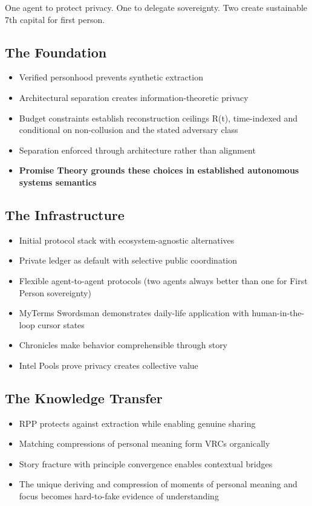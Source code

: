 \documentclass[
]{article}
\begin{document}
One agent to protect privacy. One to delegate sovereignty. Two create
sustainable 7th capital for first person.

\subsection{The Foundation}\label{the-foundation}

\begin{itemize}
\item
  Verified personhood prevents synthetic extraction
\item
  Architectural separation creates information-theoretic privacy
\item
  Budget constraints establish reconstruction ceilings R(t),
  time-indexed and conditional on non-collusion and the stated adversary
  class
\item
  Separation enforced through architecture rather than alignment
\item
  \textbf{Promise Theory grounds these choices in established autonomous
  systems semantics}
\end{itemize}

\subsection{The Infrastructure}\label{the-infrastructure}

\begin{itemize}
\item
  Initial protocol stack with ecosystem-agnostic alternatives
\item
  Private ledger as default with selective public coordination
\item
  Flexible agent-to-agent protocols (two agents always better than one
  for First Person sovereignty)
\item
  MyTerms Swordsman demonstrates daily-life application with
  human-in-the-loop cursor states
\item
  Chronicles make behavior comprehensible through story
\item
  Intel Pools prove privacy creates collective value
\end{itemize}

\subsection{The Knowledge Transfer}\label{the-knowledge-transfer}

\begin{itemize}
\item
  RPP protects against extraction while enabling genuine sharing
\item
  Matching compressions of personal meaning form VRCs organically
\item
  Story fracture with principle convergence enables contextual bridges
\item
  The unique deriving and compression of moments of personal meaning and
  focus becomes hard-to-fake evidence of understanding
\end{itemize}
\end{document}
